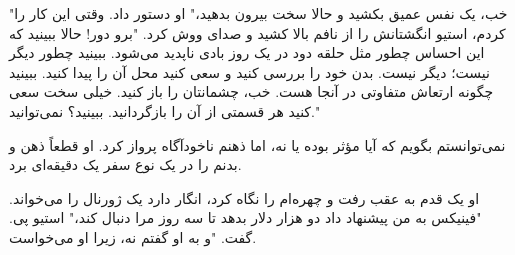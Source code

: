 "خب، یک نفس عمیق بکشید و حالا سخت بیرون بدهید،" او دستور داد. وقتی این کار را کردم، استیو انگشتانش را از نافم بالا کشید و صدای ووش کرد. "برو دور! حالا ببینید که این احساس چطور مثل حلقه دود در یک روز بادی ناپدید می‌شود. ببینید چطور دیگر نیست؛ دیگر نیست. بدن خود را بررسی کنید و سعی کنید محل آن را پیدا کنید. ببینید چگونه ارتعاش متفاوتی در آنجا هست. خب، چشمانتان را باز کنید. خیلی سخت سعی کنید هر قسمتی از آن را بازگردانید. ببینید؟ نمی‌توانید."

نمی‌توانستم بگویم که آیا مؤثر بوده یا نه، اما ذهنم ناخودآگاه پرواز کرد. او قطعاً ذهن و بدنم را در یک نوع سفر یک دقیقه‌ای برد.

او یک قدم به عقب رفت و چهره‌ام را نگاه کرد، انگار دارد یک ژورنال را می‌خواند. "فینیکس به من پیشنهاد داد دو هزار دلار بدهد تا سه روز مرا دنبال کند،" استیو پی. گفت. "و به او گفتم نه، زیرا او می‌خواست.